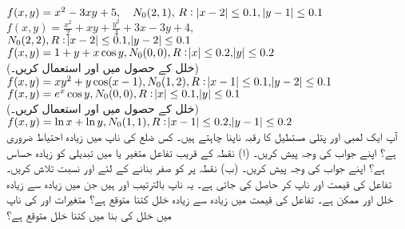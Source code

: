 $f(x,y)=x^2-3xy+5,\quad N_0(2,1),\,R:\,\abs{x-2}\le 0.1,\,\abs{y-1}\le 0.1$
$f(x,y)=\tfrac{x^2}{2}+xy+\tfrac{y^2}{4}+3x-3y+4,$\\
$N_0(2,2),R:\abs{x-2}\le 0.1,\abs{y-2}\le 0.1$
$f(x,y)=1+y+x\cos y, N_0(0,0), R:\abs{x}\le 0.2, \abs{y}\le 0.2$\\
(خلل  کے حصول میں  اور  استعمال کریں۔)
$f(x,y)=xy^2+y\cos(x-1), N_0(1,2), R:\abs{x-1}\le 0.1, \abs{y-2}\le 0.1$
$f(x,y)=e^x\cos y, N_0(0,0), R:\abs{x}\le 0.1,\abs{y}\le 0.1$\\
(خلل  کے حصول میں  اور  استعمال کریں۔)
$f(x,y)=\ln x+\ln y, N_0(1,1), R:\abs{x-1}\le 0.2,\abs{y-1}\le 0.2$
\\
آپ ایک لمبی  اور  پتلی مستطیل کا رقبہ ناپنا چاہتے ہیں۔ کس  ضلع  کی ناپ میں زیادہ احتیاط   ضروری ہے؟ اپنے جواب کی وجہ پیش کریں۔
(ا) نقطہ  کے قریب تفاعل  متغیر  یا   میں تبدیلی کو زیادہ حساس ہے؟ اپنے جواب کی وجہ پیش کریں۔ (ب) نقطہ  پر  کو صفر بنانے کے لئے  اور  نسبت تلاش کریں۔
تفاعل    کی قیمت  اور  ناپ کر حاصل کی جاتی ہے۔ یہ ناپ بالترتیب  اور  ہیں  جن میں زیادہ سے زیادہ خلل  اور  ممکن ہے۔ تفاعل کی قیمت میں زیادہ سے زیادہ خلل کتنا متوقع ہے؟
متغیرات  اور  کی ناپ میں  خلل کی بنا   میں کتنا خلل متوقع ہے؟
